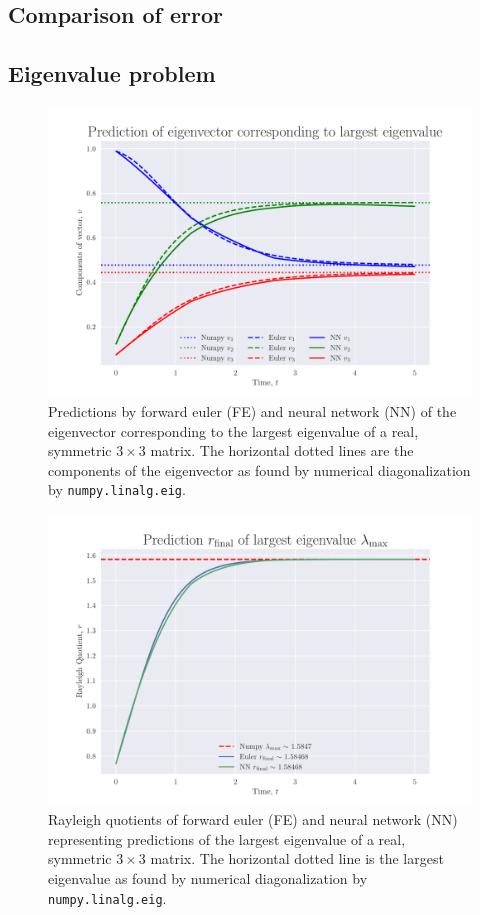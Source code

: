 \documentclass[12pt]{extarticle}
\def\code#1{\texttt{#1}}
\begin{document}
\subsection{Comparison of error}


\subsection{Eigenvalue problem}


\begin{figure}[h!]
	\centering
	\includegraphics[scale=0.75]{../output/plots/eigvec_T5_N1000.pdf}
	\caption{Predictions by forward euler (FE) and neural network (NN) of the eigenvector corresponding to the largest eigenvalue of a real, symmetric $3\times 3$ matrix. The horizontal dotted lines are the components of the eigenvector as found by numerical diagonalization by \code{numpy.linalg.eig}.}
	\label{fig:eigvec_T5_N1000}
\end{figure}

\begin{figure}[h!]
	\centering
	\includegraphics[scale=0.75]{../output/plots/eigval_T5_N1000.pdf}
	\caption{Rayleigh quotients of forward euler (FE) and neural network (NN) representing predictions of the largest eigenvalue of a real, symmetric $3\times 3$ matrix. The horizontal dotted line is the largest eigenvalue as found by numerical diagonalization by \code{numpy.linalg.eig}.}
	\label{fig:eigval_T5_N1000}
\end{figure}
\end{document}
